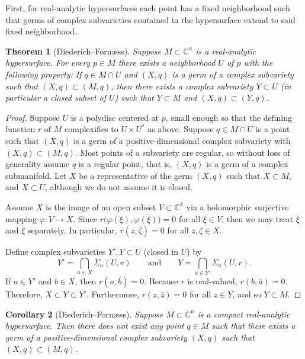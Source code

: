 \documentclass[12pt,openany]{book}
\newcommand{\C}{{\mathbb{C}}}
\theoremstyle{plain}
\newtheorem{thm}{Theorem}[section]
\newtheorem{cor}[thm]{Corollary}
\theoremstyle{remark}
\theoremstyle{definition}
\theoremstyle{exercise}
\theoremstyle{example}
\begin{document}
First, for real-analytic hypersurfaces each point has a fixed neighborhood
such that germs of complex subvarieties contained in the hypersurface extend
to said fixed neighborhood.

\begin{thm}[Diederich--Forn\ae ss]
\pagebreak[2]
Suppose $M \subset \C^n$ is a real-analytic hypersurface.  For every
$p \in M$ there exists a neighborhood $U$ of $p$ with the following
property:
If $q \in M \cap U$ and
$(X,q)$ is a germ of a complex subvariety
such that $(X,q) \subset (M,q)$,
then there exists a complex subvariety $Y \subset U$ (in
particular a closed subset of $U$) such that $Y \subset M$ and $(X,q)
\subset (Y,q)$.
\end{thm}

\begin{proof}
Suppose $U$ is a polydisc centered at $p$,
small enough so that the defining function
$r$ of $M$ complexifies to $U \times U^*$ as above.
Suppose $q \in M \cap U$ is a point such that $(X,q)$ is a germ of a
positive-dimensional complex subvariety with $(X,q) \subset (M,q)$.
Most points of a subvariety are regular, so
without loss of generality assume $q$ is a regular point, that is,
$(X,q)$ is a germ of a complex submanifold.
Let $X$ be a representative of the germ $(X,q)$ such that $X \subset M$,
and $X \subset U$, although we do not assume it is closed.

Assume $X$ is the
image of an open subset $V \subset \C^k$ via a holomorphic surjective mapping $\varphi \colon V \to
X$.  Since $r\bigl(\varphi(\xi),\overline{\varphi(\xi)}\bigr) = 0$
for all $\xi \in V$, then we may treat $\xi$ and $\bar{\xi}$ separately.
In particular,
$r(z,\bar{\zeta}) = 0$ for all $z,\zeta \in X$.

Define complex subvarieties $Y', Y \subset U$ (closed in $U$) by
\begin{equation*}
Y' = \bigcap_{a \in X} \Sigma_a(U,r)
\qquad \text{and} \qquad
Y = \bigcap_{a \in Y'} \Sigma_a(U,r) .
\end{equation*}
If $a \in Y'$ and $b \in X$, then $r(a,\bar{b}) = 0$.
Because $r$ is real-valued,
$r(b,\bar{a}) = 0$.  Therefore,
$X \subset Y \subset Y'$.  Furthermore, $r(z,\bar{z}) = 0$
for all $z \in Y$, and so $Y \subset M$.
\end{proof}

\begin{cor}[Diederich--Forn\ae ss]
Suppose $M \subset \C^n$ is a compact real-analytic hypersurface.
Then there does not exist any point $q \in M$ such that
there exists a germ of a positive-dimensional complex subvariety
$(X,q)$ such that $(X,q) \subset (M,q)$.
\end{cor}
\end{document}
